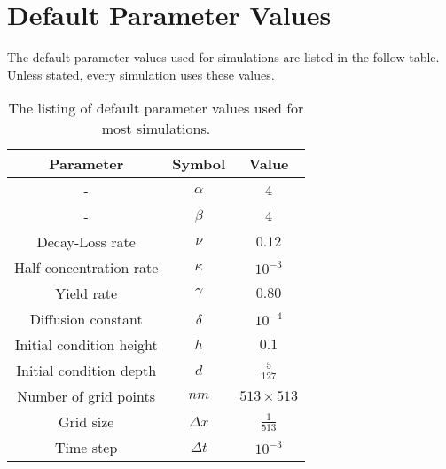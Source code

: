 
\pagestyle{appendix-param}
\chapter{Default Parameter Values}

The default parameter values used for simulations are listed in the follow table. Unless stated, every simulation uses these values.

\begin{table}[h!tb]
  \centering
  \begin{tabular}{| c | c | c |}
    \hline
    Parameter & Symbol & Value \\
    \hline
    - & $\alpha$    & $4$ \\
    - & $\beta$     & $4$ \\
    Decay-Loss rate & $\nu$       & $0.12$ \\
    Half-concentration rate & $\kappa$    & $10^{-3}$ \\
    Yield rate & $\gamma$    & $0.80$ \\
    Diffusion constant & $\delta$    & $10^{-4}$ \\
    \hline
    Initial condition height & $h$ & $0.1$ \\
    Initial condition depth & $d$ & $\frac{5}{127}$ \\
    \hline
    Number of grid points & $nm$ & $513 \times 513$ \\
    Grid size & $\Delta x$  & $\frac{1}{513}$ \\
    Time step & $\Delta t$  & $10^{-3}$ \\
    \hline
  \end{tabular}
  \caption{The listing of default parameter values used for most simulations.}
  \label{tab:default-parameters}
\end{table}


